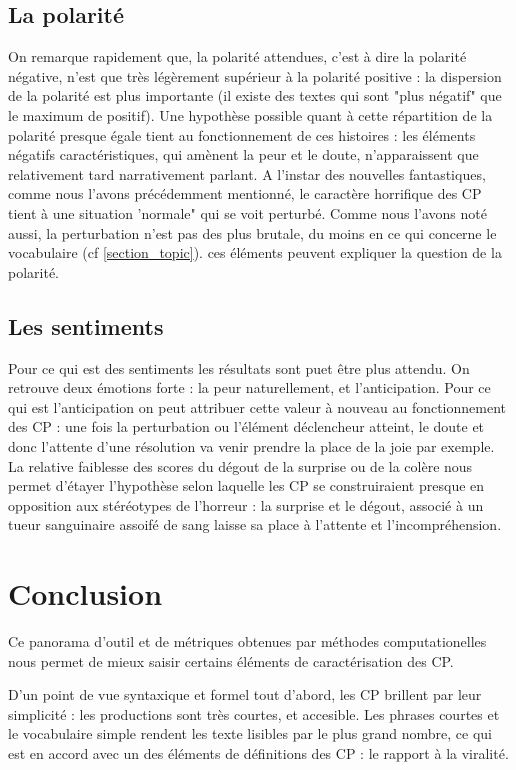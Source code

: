 \documentclass[12pt,a4paper,oneside,titlepage]{book} %
\begin{document}
\subsection{La polarité}
On remarque rapidement que, la polarité attendues, c'est à dire la polarité négative, n'est que très légèrement supérieur à la polarité positive :  la dispersion de la polarité est plus importante (il existe des textes qui sont "plus négatif" que le maximum de positif). 
Une hypothèse possible quant à cette répartition de la polarité presque égale tient au fonctionnement de ces histoires : les éléments négatifs caractéristiques, qui amènent la peur et le doute, n'apparaissent que relativement tard narrativement parlant. A l'instar des nouvelles fantastiques, comme nous l'avons précédemment mentionné, le caractère horrifique des CP tient à une situation 'normale"  qui se voit perturbé. Comme nous l'avons noté aussi, la perturbation n'est pas des plus brutale, du moins en ce qui concerne le vocabulaire (cf \ref{section_topic}). ces éléments peuvent expliquer la question de la polarité.
	

\subsection{Les sentiments}
Pour ce qui est des sentiments les résultats sont puet être plus attendu. On retrouve deux émotions forte : la peur naturellement, et l'anticipation.  Pour ce qui est l'anticipation on peut attribuer cette valeur à nouveau au fonctionnement des CP : une fois la perturbation ou l'élément déclencheur atteint, le doute et donc l'attente d'une résolution va venir prendre la place de la joie par exemple.
La relative faiblesse des scores du dégout de la surprise ou de la colère nous permet d'étayer l'hypothèse selon laquelle les CP se construiraient presque en opposition aux stéréotypes de l'horreur : la surprise et le dégout, associé à un tueur sanguinaire assoifé de sang laisse sa place à l'attente et l'incompréhension.


\section{Conclusion}
Ce panorama d'outil et de métriques obtenues par méthodes computationelles nous permet de mieux saisir certains éléments de caractérisation des CP. 
\par
D'un point de vue syntaxique et formel tout d'abord,  les CP brillent par leur simplicité : les productions sont très courtes, et accesible. Les phrases courtes et le vocabulaire simple rendent les texte lisibles par le plus grand nombre, ce qui est en accord avec un des éléments de définitions des CP : le rapport à la viralité.
\end{document}
